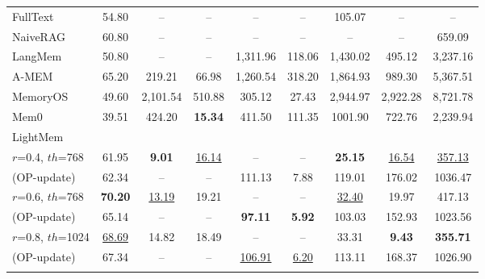 \begin{table}[t]
{\begin{tabular}{@{}lcccccccc@{}}
\rowcolor{qwenbar}\multicolumn{9}{c}{\qwenlogo\ \textbf{Qwen3-30B-A3B-Instruct-2507}}\\
\midrule
\rowcolor{qwenlav} FullText          & 54.80    & --      & --     & --      & --      & 105.07       & --       & -- \\
\rowcolor{qwenlav} NaiveRAG          & 60.80    & --      & --     & --      & --      & --       & --       & 659.09 \\
\rowcolor{qwenlav} LangMem          & 50.80    & --      & --     & 1,311.96      & 118.06      & 1,430.02       & 495.12       & 3,237.16 \\
\rowcolor{qwenlav} A-MEM            & 65.20    & 219.21      & 66.98     & 1,260.54      & 318.20      & 1,864.93       & 989.30     & 5,367.51 \\
\rowcolor{qwenlav} MemoryOS         & 49.60 & 2,101.54& 510.88 & 305.12  & 27.43   & 2,944.97 & 2,922.28 & 8,721.78 \\
\rowcolor{qwenlav} Mem0             & 39.51 & 424.20 & \textbf{15.34}  & 411.50  & 111.35  &  1001.90  & 722.76 & 2,239.94 \\

\hdashline

\rowcolor{qwenlav} 
LightMem                  & & & & & & & &\\
\rowcolor{qwenlav} 
$r$=0.4, $th$=768 & 61.95 & \textbf{9.01} & \underline{16.14} & -- & -- & \textbf{25.15} & \underline{16.54} & \underline{357.13} \\
\rowcolor{qwenlav} 
(OP-update) & 62.34 & -- & -- & 111.13 & 7.88 & 119.01 & 176.02 & 1036.47 \\
\rowcolor{qwenlav} 
$r$=0.6, $th$=768 & \textbf{70.20} & \underline{13.19} & 19.21 & -- & -- & \underline{32.40} & 19.97 & 417.13 \\
\rowcolor{qwenlav} 
(OP-update) & 65.14 & -- & -- & \textbf{97.11} & \textbf{5.92} & 103.03 & 152.93 & 1023.56 \\
\rowcolor{qwenlav} 
$r$=0.8, $th$=1024 & \underline{68.69} & 14.82 & 18.49 & -- & -- & 33.31 & \textbf{9.43} & \textbf{355.71} \\
\rowcolor{qwenlav} 
(OP-update) & 67.34 & -- & -- & \underline{106.91} & \underline{6.20} & 113.11 & 168.37 & 1026.90 \\

\addlinespace[0.4ex]
\midrule


\end{tabular}}
\end{table}
